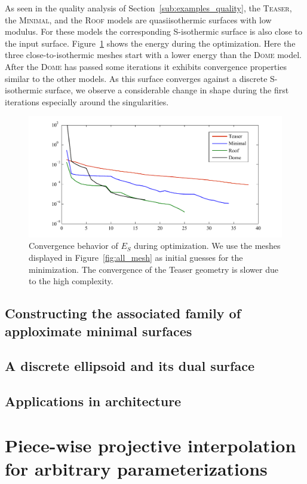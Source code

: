 As seen in the quality analysis of Section~\ref{sub:examples_quality}, the
\textsc{Teaser}, the \textsc{Minimal}, and the \textsc{Roof} models are
quasiisothermic surfaces with low modulus. For these models the corresponding S-isothermic
surface is also close to the input surface. Figure~\ref{fig:convergence} shows
the energy during the optimization. Here the three close-to-isothermic meshes
start with a lower energy than the \textsc{Dome} model. After the \textsc{Dome}
has passed some iterations it exhibits convergence properties similar to the
other models. As this surface converges against a discrete S-isothermic surface,
we observe a considerable change in shape during the first iterations
especially around the singularities.

\begin{figure}
\centering
\includegraphics[width=0.7\linewidth]{image/aag2012/convergence_plots_embedded.pdf}
\caption{Convergence behavior of $E_S$ during optimization. We use the meshes 
displayed in Figure~\ref{fig:all_mesh} as initial guesses for the minimization. The
convergence of the Teaser geometry is slower due to the high complexity.}
\label{fig:convergence}
\end{figure}

\subsection{Constructing the associated family of apploximate minimal surfaces}
\subsection{A discrete ellipsoid and its dual surface}
\subsection{Applications in architecture}

\section[Piece-wise projective interpolation for arbitrary parameterizations] %
{Piece-wise projective interpolation for arbitrary parameterizations %
}

